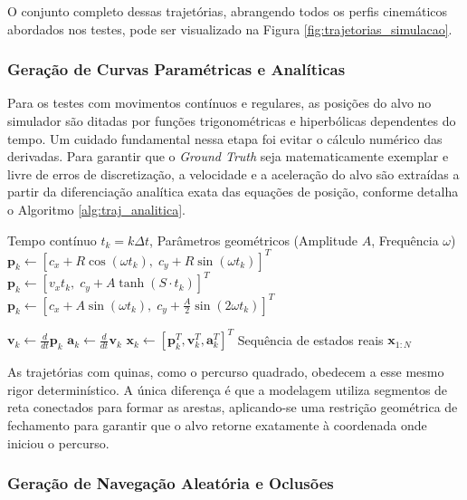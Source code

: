 O conjunto completo dessas trajetórias, abrangendo todos os perfis cinemáticos abordados nos testes, pode ser visualizado na Figura \ref{fig:trajetorias_simulacao}.

\subsubsection{Geração de Curvas Paramétricas e Analíticas}

Para os testes com movimentos contínuos e regulares, as posições do alvo no simulador são ditadas por funções trigonométricas e hiperbólicas dependentes do tempo. Um cuidado fundamental nessa etapa foi evitar o cálculo numérico das derivadas. Para garantir que o \textit{Ground Truth} seja matematicamente exemplar e livre de erros de discretização, a velocidade e a aceleração do alvo são extraídas a partir da diferenciação analítica exata das equações de posição, conforme detalha o Algoritmo \ref{alg:traj_analitica}.

\begin{algorithm}[h]
\caption{Geração de Trajetórias Paramétricas Analíticas}
\label{alg:traj_analitica}
\begin{algorithmic}[1]
\Require Tempo contínuo $t_k = k \Delta t$, Parâmetros geométricos (Amplitude $A$, Frequência $\omega$)
        \State $\mathbf{p}_k \gets [c_x + R\cos(\omega t_k), \; c_y + R\sin(\omega t_k)]^T$
        \State $\mathbf{p}_k \gets [v_x t_k, \; c_y + A\tanh(S \cdot t_k)]^T$
        \State $\mathbf{p}_k \gets [c_x + A\sin(\omega t_k), \; c_y + \frac{A}{2}\sin(2\omega t_k)]^T$
    \EndIf
    
    \State $\mathbf{v}_k \gets \frac{d}{dt}\mathbf{p}_k$
    \State $\mathbf{a}_k \gets \frac{d}{dt}\mathbf{v}_k$
    \State $\mathbf{x}_k \gets [\mathbf{p}_k^T, \mathbf{v}_k^T, \mathbf{a}_k^T]^T$
\EndFor
\Ensure Sequência de estados reais $\mathbf{x}_{1:N}$
\end{algorithmic}
\end{algorithm}

As trajetórias com quinas, como o percurso quadrado, obedecem a esse mesmo rigor determinístico. A única diferença é que a modelagem utiliza segmentos de reta conectados para formar as arestas, aplicando-se uma restrição geométrica de fechamento para garantir que o alvo retorne exatamente à coordenada onde iniciou o percurso.

\subsubsection{Geração de Navegação Aleatória e Oclusões}

